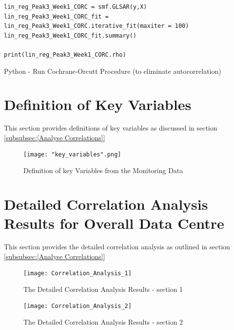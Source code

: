 \documentclass[12pt]{scrartcl}
\begin{document}
\begin{listing}[H]
\begin{verbatim}
lin_reg_Peak3_Week1_CORC = smf.GLSAR(y,X)
lin_reg_Peak3_Week1_CORC_fit = lin_reg_Peak3_Week1_CORC.iterative_fit(maxiter = 100)
lin_reg_Peak3_Week1_CORC_fit.summary()

print(lin_reg_Peak3_Week1_CORC.rho) 

\end{verbatim}
\caption{Python - Run Cochrane-Orcutt Procedure (to eliminate autocorrelation)}
\label{list:[Python - Run Cochrane-Orcutt Procedure (to eliminate autocorrelation)]}
\end{listing}



\section{Definition of Key Variables}
\label{sec:[Definition of key Variables]}

This section provides definitions of key variables as discussed in section \ref{subsubsec:[Analyse Correlations]}

\begin{figure}[h]
  \caption{Definition of key Variables from the Monitoring Data}
  \label{fig:key_variables}
  \centering
    \texttt{[image: "key\_variables".png]}
\end{figure} 



\section{Detailed Correlation Analysis Results for Overall Data Centre}
\label{sec:[Data Centre Correlation Analysis Results]}
This section provides the detailed correlation analysis as outlined in section \ref{subsubsec:[Analyse Correlations]}


\begin{figure}[H]
  \caption{The Detailed Correlation Analysis Results - section 1}
  \label{fig:Correlation_Analysis_1}
  \centering
    \texttt{[image: Correlation\_Analysis\_1]}
\end{figure} 

\begin{figure}[H]
  \caption{The Detailed Correlation Analysis Results - section 2}
  \label{fig:Correlation_Analysis_2}
  \centering
    \texttt{[image: Correlation\_Analysis\_2]}
\end{figure} 
\end{document}
